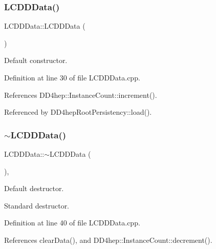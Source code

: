 \subsubsection{\texorpdfstring{L\+C\+D\+D\+Data()}{LCDDData()}\hspace{0.1cm}{\footnotesize\ttfamily [1/2]}}
{\footnotesize\ttfamily L\+C\+D\+D\+Data\+::\+L\+C\+D\+D\+Data (\begin{DoxyParamCaption}{ }\end{DoxyParamCaption})\hspace{0.3cm}{\ttfamily [protected]}}



Default constructor. 



Definition at line 30 of file L\+C\+D\+D\+Data.\+cpp.



References D\+D4hep\+::\+Instance\+Count\+::increment().



Referenced by D\+D4hep\+Root\+Persistency\+::load().

\hypertarget{class_d_d4hep_1_1_geometry_1_1_l_c_d_d_data_ac0b2ce6ff949288f48cdffc399f21808}{}\label{class_d_d4hep_1_1_geometry_1_1_l_c_d_d_data_ac0b2ce6ff949288f48cdffc399f21808} 
\subsubsection{\texorpdfstring{$\sim$\+L\+C\+D\+D\+Data()}{~LCDDData()}}
{\footnotesize\ttfamily L\+C\+D\+D\+Data\+::$\sim$\+L\+C\+D\+D\+Data (\begin{DoxyParamCaption}{ }\end{DoxyParamCaption})\hspace{0.3cm}{\ttfamily [protected]}, {\ttfamily [virtual]}}



Default destructor. 

Standard destructor. 

Definition at line 40 of file L\+C\+D\+D\+Data.\+cpp.



References clear\+Data(), and D\+D4hep\+::\+Instance\+Count\+::decrement().

